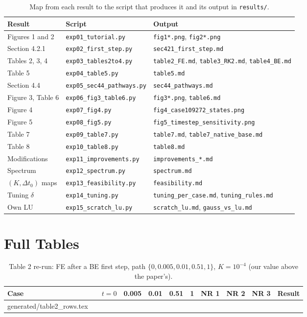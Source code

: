 \documentclass[sigconf,nonacm]{acmart}
\makeatletter
\newcommand{\rows}[1]{\@@input #1 }
\newcommand{\thead}[1]{\textbf{#1}}
\newcommand{\code}[1]{\texttt{#1}}
\makeatother
\begin{document}
\begin{table}[!htbp]
\centering
\caption{Map from each result to the script that produces it and its output in \code{results/}.}
\label{tab:scripts}
\small
\begin{tabular}{@{}l l l@{}}
\toprule
\thead{Result} & \thead{Script} & \thead{Output} \\
\midrule
Figures 1 and 2 & \code{exp01\_tutorial.py} & \code{fig1*.png}, \code{fig2*.png} \\
Section 4.2.1 & \code{exp02\_first\_step.py} & \code{sec421\_first\_step.md} \\
Tables 2, 3, 4 & \code{exp03\_tables2to4.py} & \code{table2\_FE.md}, \code{table3\_RK2.md}, \code{table4\_BE.md} \\
Table 5 & \code{exp04\_table5.py} & \code{table5.md} \\
Section 4.4 & \code{exp05\_sec44\_pathways.py} & \code{sec44\_pathways.md} \\
Figure 3, Table 6 & \code{exp06\_fig3\_table6.py} & \code{fig3*.png}, \code{table6.md} \\
Figure 4 & \code{exp07\_fig4.py} & \code{fig4\_case109272\_states.png} \\
Figure 5 & \code{exp08\_fig5.py} & \code{fig5\_timestep\_sensitivity.png} \\
Table 7 & \code{exp09\_table7.py} & \code{table7.md}, \code{table7\_native\_base.md} \\
Table 8 & \code{exp10\_table8.py} & \code{table8.md} \\
Modifications & \code{exp11\_improvements.py} & \code{improvements\_*.md} \\
Spectrum & \code{exp12\_spectrum.py} & \code{spectrum.md} \\
$(K,\Delta t_0)$ maps & \code{exp13\_feasibility.py} & \code{feasibility.md} \\
Tuning $\delta$ & \code{exp14\_tuning.py} & \code{tuning\_per\_case.md}, \code{tuning\_rules.md} \\
Own LU & \code{exp15\_scratch\_lu.py} & \code{scratch\_lu.md}, \code{gauss\_vs\_lu.md} \\
\bottomrule
\end{tabular}
\end{table}

\FloatBarrier
\section{Full Tables}\label{app:tables}

\begin{table}[!htbp]
\centering
\caption{Table 2 re-run: FE after a BE first step, path $\{0,0.005,0.01,0.51,1\}$, $K=10^{-4}$ (our value
above the paper's).}
\label{tab:fe}
\scriptsize
\setlength{\tabcolsep}{4pt}
\begin{tabular}{@{}l l r r r r r r r r l@{}}
\toprule
\thead{Case} & & \thead{$t{=}0$} & \thead{0.005} & \thead{0.01} & \thead{0.51} & \thead{1} & \thead{NR 1} & \thead{NR 2} & \thead{NR 3} & \thead{Result} \\
\midrule
\rows{generated/table2_rows.tex}
\bottomrule
\end{tabular}
\end{table}
\end{document}
